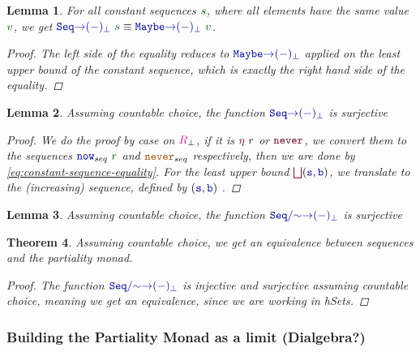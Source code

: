\documentclass[twoside,11pt,openright]{report}
\theoremstyle{plain} %
\newtheorem{thm}{Theorem}[section]
\newtheorem{lem}[thm]{Lemma}
\theoremstyle{definition}
\theoremstyle{remark}
\newcommand*{\term}[1]{\textcolor{green!30!black}{#1}} %
\newcommand*{\type}[1]{\textcolor{magenta!90!black}{#1}}
\newcommand*{\constant}[1]{\textcolor{orange!60!black}{\ensuremath{\mathtt{#1}}}}
\newcommand*{\function}[1]{\textcolor{blue!60!black}{\ensuremath{\mathtt{#1}}}}
\newcommand*{\constructor}[1]{\textcolor{purple!60!black}{\ensuremath{\mathtt{#1}}}}
\begin{document}
\begin{lem}
  \label{eq:constant-sequence-equality}
  For all constant sequences \(\term{s}\), where all elements have the same value \(\term{v}\), we get \(\function{Seq{\rightarrow}(-)_\bot}~\term{s} \equiv \function{Maybe{\rightarrow}(-)_\bot}~\term{v}\).
  \begin{proof}
    The left side of the equality reduces to \(\function{Maybe{\rightarrow}(-)_\bot}\) applied on the least upper bound of the constant sequence, which is exactly the right hand side of the equality.
  \end{proof}
\end{lem}
\begin{lem}
  Assuming countable choice, the function \(\function{Seq{\rightarrow}(-)_\bot}\) is surjective
  \begin{proof}
    We do the proof by case  on \(\type{R}_{\bot}\), if it is \(\constructor{\eta}~r\) or \(\constructor{never}\), we convert them to the sequences \(\function{now}_{seq}~\term{r}\) and \(\constant{never}_{seq}\) respectively, then we are done by \eqref{eq:constant-sequence-equality}. For the least upper bound \(\constructor{\bigsqcup} (\function{s},\function{b})\), we translate to the (increasing) sequence, defined by \((\function{s},\function{b})\) . 
  \end{proof}
\end{lem}
\begin{lem}
  Assuming countable choice, the function \(\function{Seq/{\sim}{\rightarrow}(-)_\bot}\) is surjective
  
\end{lem}
\begin{thm}
  Assuming countable choice, we get an equivalence between sequences and the partiality monad.
  \begin{proof}
 The function \(\function{Seq/{\sim}{\rightarrow}(-)_\bot}\) is injective and surjective assuming countable choice, meaning we get an equivalence, since we are working in hSets.
\end{proof}
\end{thm}

\subsubsection{Building the Partiality Monad as a limit (Dialgebra?)}
\end{document}
